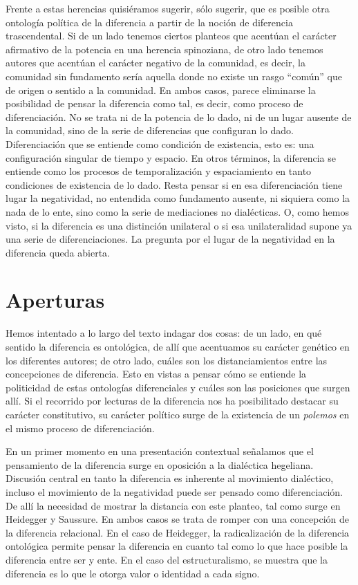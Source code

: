 Frente a estas herencias quisiéramos sugerir, sólo sugerir, que es posible otra ontología política de la diferencia a partir de la noción de diferencia trascendental. Si de un lado tenemos ciertos planteos que acentúan el carácter afirmativo de la potencia en una herencia spinoziana, de otro lado tenemos autores que acentúan el carácter negativo de la comunidad, es decir, la comunidad sin fundamento sería aquella donde no existe un rasgo \enquote{común} que de origen o sentido a la comunidad. En ambos casos, parece eliminarse la posibilidad de pensar la diferencia como tal, es decir, como proceso de diferenciación. No se trata ni de la potencia de lo dado, ni de un lugar ausente de la comunidad, sino de la serie de diferencias que configuran lo dado. Diferenciación que se entiende como condición de existencia, esto es: una configuración singular de tiempo y espacio. En otros términos, la diferencia se entiende como los procesos de temporalización y espaciamiento en tanto condiciones de existencia de lo dado. Resta pensar si en esa diferenciación tiene lugar la negatividad, no entendida como fundamento ausente, ni siquiera como la nada de lo ente, sino como la serie de mediaciones no dialécticas. O, como hemos visto, si la diferencia es una distinción unilateral o si esa unilateralidad supone ya una serie de diferenciaciones. La pregunta por el lugar de la negatividad en la diferencia queda abierta.

\section{Aperturas}

Hemos intentado a lo largo del texto indagar dos cosas: de un lado, en qué sentido la diferencia es ontológica, de allí que acentuamos su carácter genético en los diferentes autores; de otro lado, cuáles son los distanciamientos entre las concepciones de diferencia. Esto en vistas a pensar cómo se entiende la politicidad de estas ontologías diferenciales y cuáles son las posiciones que surgen allí. Si el recorrido por lecturas de la diferencia nos ha posibilitado destacar su carácter constitutivo, su carácter político surge de la existencia de un \emph{polemos} en el mismo proceso de diferenciación.

En un primer momento en una presentación contextual señalamos que el pensamiento de la diferencia surge en oposición a la dialéctica hegeliana. Discusión central en tanto la diferencia es inherente al movimiento dialéctico, incluso el movimiento de la negatividad puede ser pensado como diferenciación. De allí la necesidad de mostrar la distancia con este planteo, tal como surge en Heidegger y Saussure. En ambos casos se trata de romper con una concepción de la diferencia relacional. En el caso de Heidegger, la radicalización de la diferencia ontológica permite pensar la diferencia en cuanto tal como lo que hace posible la diferencia entre ser y ente. En el caso del estructuralismo, se muestra que la diferencia es lo que le otorga valor o identidad a cada signo.

